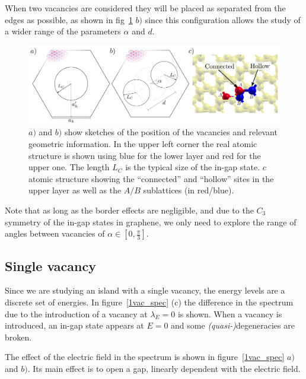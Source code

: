 When two vacancies are considered they will be placed as separated from the edges as possible, as shown in fig~\ref{geo_sketch} $b)$ since this configuration allows the study of a wider range of the parameters $\alpha$ and $d$.
\begin{figure}[h!]
\centering
\includegraphics[width=\textwidth]{chapter06/figures/vacs_sketch.pdf}
\vspace{-15pt}
\caption{$a)$ and $b)$ show sketches of the position of the vacancies and relevant geometric information. In the upper left corner the real atomic structure is shown using blue for the lower layer and red for the upper one. The length $L_C$ is the typical size of the in-gap state. $c$ atomic structure showing the ``connected'' and ``hollow'' sites in the upper layer as well as the $A/B$ sublattices (in red/blue).}
\label{geo_sketch}
\end{figure}
\FloatBarrier

Note that as long as the border effects are negligible, and due to the $C_3$ symmetry of the in-gap states in graphene, we only need to explore the range of angles between vacancies of $\alpha\in\left[0,\tfrac{\pi}{3}\right]$.


\subsection{Single vacancy} %
Since we are studying an island with a single vacancy, the energy levels are a discrete set of energies. In figure~\ref{1vac_spec} (c) the difference in the spectrum due to the introduction of a vacancy at $\lambda_E=0$ is shown. When a vacancy is introduced, an in-gap state appears at $E=0$ and some \emph{(quasi-)}degeneracies are broken.

The effect of the electric field in the spectrum is shown in figure~\ref{1vac_spec} $a)$ and $b)$. Its main effect is to open a gap, linearly dependent with the electric field.

